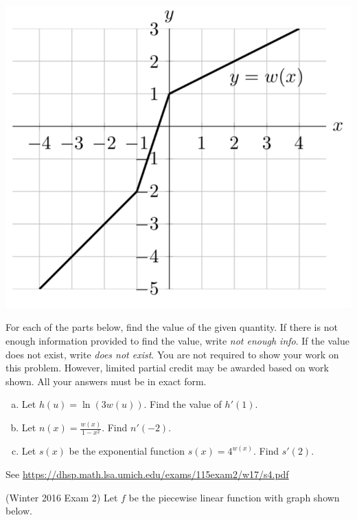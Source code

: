 \documentclass[11pt]{exam}
\begin{document}
\begin{questions}
\begin{center}
    \includegraphics[scale=0.6]{graphw.png}
  \end{center}
	For each of the parts below, find the value of the given quantity. If there is not enough information provided to find the value, write \emph{not enough info}. If the value does not exist, write \emph{does not exist}. You are not required to show your work on this problem. However, limited partial credit
may be awarded based on work shown. All your
answers must be in exact form.
	\begin{enumerate}[(a)]
		\item Let $h(u) = \ln(3w(u))$. Find the value of $h'(1)$.
		\item Let $n(x) = \frac{w(x)}{1-x^2}$. Find $n'(-2)$.
		\item Let $s(x)$ be the exponential function $s(x) = 4^{w(x)}$. Find $s'(2)$.
	\end{enumerate}
        \begin{solution}
          See \href{https://dhsp.math.lsa.umich.edu/exams/115exam2/w17/s4.pdf}{https://dhsp.math.lsa.umich.edu/exams/115exam2/w17/s4.pdf}
        \end{solution}
\question (Winter 2016 Exam 2) Let $f$ be the piecewise linear function with graph shown below.


\end{questions}
\end{document}
